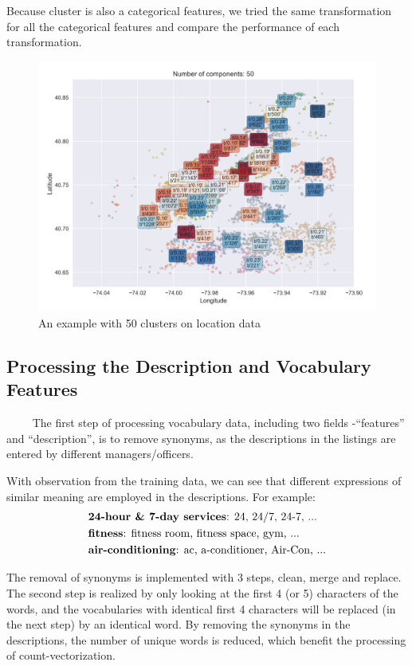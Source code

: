 \documentclass{article}
\begin{document}
Because cluster is also a categorical features, we tried the same transformation for all the categorical features and compare the performance of each transformation.
\begin{figure}[htbp]
\centering
    \includegraphics[scale=0.16]{pic/cluster_50.png} 
    \caption{An example with 50 clusters on location data} \label{cluster50}
\end{figure}

\subsection{Processing the Description and Vocabulary Features}

~~~~ The first step of processing vocabulary data, including two fields -``features'' and ``description'', is to remove synonyms, as the descriptions in the listings are entered by different managers/officers. 

With observation from the training data, we can see that different expressions of similar meaning are employed in the descriptions. For example:
\begin{align*}
    & \text{\textbf{24-hour \& 7-day services}: 24, 24/7, 24-7, ...} \\
    & \text{\textbf{fitness}: fitness room, fitness space, gym, ...} \\
    & \text{\textbf{air-conditioning}: ac, a-conditioner, Air-Con, ...}
\end{align*}

The removal of synonyms is implemented with 3 steps, clean, merge and replace. The second step is realized by only looking at the first 4 (or 5) characters of the words, and the vocabularies with identical first 4 characters will be replaced (in the next step) by an identical word. By removing the synonyms in the descriptions, the number of unique words is reduced, which benefit the processing of count-vectorization.
 
\end{document}
